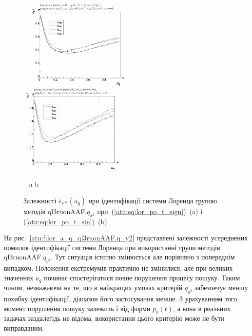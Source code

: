\begin{figure}[ht!]
  \begin{center}
    ~ \hfill
    \includegraphics[width=0.49\textwidth]{p/cha/lor/ql3ruonAAF/lor_ql3ruonAAF_qx2-p_a_q_e_sign.png}
    \hfill
    \includegraphics[width=0.49\textwidth]{p/cha/lor/ql3ruonAAF/lor_ql3ruonAAF_qx2-p_a_q_e_sin.png}
    \hfill ~
  \end{center}
  \vspace{-1.0ex}
  \begin{center}
    ~ \hfill a \hfill\hfill b \hfill ~
  \end{center}
  \vspace{-1.5ex}
  \caption{Залежності $ \overline{e}_{r *} (a_q) $ при ідентифікації системи Лоренца групою методів ql3ruonAAF.$q_{x^2} $ при~(\ref{atu:eq:lor_po_t_sign})~(a) і (\ref{atu:eq:lor_po_t_sin})~(b)}
  \label{atu:f:lor_a_q_ql3ruonAAF.q_x2}
\end{figure}


На рис.~\ref{atu:f:lor_a_q_ql3ruonAAF.q_y2} представлені залежності усереднених
помилок ідентифікації системи Лоренца при використанні групи методів ql3ruonAAF.$q_{y^2}$.
Тут ситуація істотно змінюється але порівняно з
попереднім випадком. Положення екстремумів практично не
змінилися, але при великих значеннях
$ a_q $ починає спостерігатися повне порушення процесу
пошуку. Таким чином, незважаючи на те, що в найкращих умовах
критерій
$ q_{y^2} $ забезпечує меншу похибку ідентифікації, діапазон його
застосування менше. З урахуванням того, момент порушення пошуку
залежить і від форми
$ p_o (t) $, а вона в реальних задачах заздалегідь не відома,
використання цього критерію може не бути виправданим.

